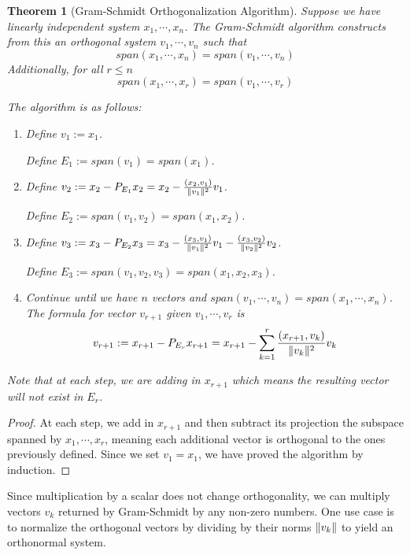 \documentclass[a4paper,10pt]{book}
\DeclarePairedDelimiter{\norm}{\lVert}{\rVert}
\theoremstyle{plain}
\newtheorem{theorem}{Theorem}[section]
\theoremstyle{plain}
\theoremstyle{remark}
\theoremstyle{definition}
\begin{document}
\begin{theorem}[Gram-Schmidt Orthogonalization Algorithm]
Suppose we have linearly independent system $x_{1}, \cdots, x_{n}$. The Gram-Schmidt algorithm constructs from this an orthogonal system $v_{1}, \cdots, v_{n}$ such that 
$$span(x_{1}, \cdots, x_{n}) = span(v_{1}, \cdots, v_{n})$$
Additionally, for all $r \leq n$ 
$$span(x_{1}, \cdots, x_{r}) = span(v_{1}, \cdots, v_{r})$$

The algorithm is as follows: 
\begin{enumerate}
	\item Define $v_{1} := x_{1}$. 
	
	Define $E_{1} := span(v_{1}) = span(x_{1})$. 
	\item Define $v_{2} := x_{2} - P_{E_{1}} x_{2} = x_{2} - \frac{(x_{2}, v_{1})}{\norm{v_{1}}^{2}} v_{1}$. 
	
	Define $E_{2} := span(v_{1}, v_{2}) = span(x_{1}, x_{2})$. 
	\item Define $v_{3} := x_{3} - P_{E_{2}} x_{3} = x_{3} - \frac{(x_{3}, v_{1})}{\norm{v_{1}}^{2}} v_{1} - \frac{(x_{3}, v_{2})}{\norm{v_{2}}^{2}} v_{2}$. 
	
	Define $E_{3} := span(v_{1}, v_{2}, v_{3}) = span(x_{1}, x_{2}, x_{3})$. 
	
	\item Continue until we have $n$ vectors and $span(v_{1}, \cdots, v_{n}) = span(x_{1}, \cdots, x_{n})$. The formula for vector $v_{r + 1}$ given $v_{1}, \cdots, v_{r}$ is 
	$$ v_{r + 1} := x_{r + 1} - P_{E_{r}} x_{r + 1} = x_{r + 1} - \sum_{k = 1}^{r} \frac{(x_{r + 1}, v_{k})}{\norm{v_{k}}^{2}} v_{k}$$
\end{enumerate}

Note that at each step, we are adding in $x_{r + 1}$ which means the resulting vector will not exist in $E_{r}$. 
\end{theorem}

\begin{proof}
At each step, we add in $x_{r + 1}$ and then subtract its projection the subspace spanned by $x_{1}, \cdots, x_{r}$, meaning each additional vector is orthogonal to the ones previously defined. Since we set $v_{1} = x_{1}$, we have proved the algorithm by induction. 
\end{proof}

Since multiplication by a scalar does not change orthogonality, we can multiply vectors $v_{k}$ returned by Gram-Schmidt by any non-zero numbers. One use case is to normalize the orthogonal vectors by dividing by their norms $\norm{v_{k}}$ to yield an orthonormal system. 
\end{document}
